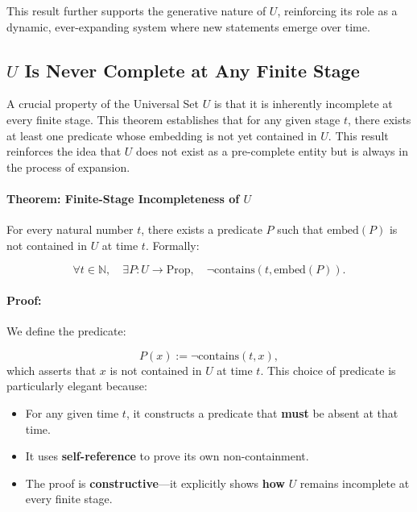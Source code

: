 \documentclass[12pt]{article}
\begin{document}
This result further supports the generative nature of \( U \), reinforcing its role as a dynamic, ever-expanding system where new statements emerge over time.


\subsection{\( U \) Is Never Complete at Any Finite Stage}

A crucial property of the Universal Set \( U \) is that it is inherently incomplete at every finite stage. This theorem establishes that for any given stage \( t \), there exists at least one predicate whose embedding is not yet contained in \( U \). This result reinforces the idea that \( U \) does not exist as a pre-complete entity but is always in the process of expansion.

\paragraph{Theorem: Finite-Stage Incompleteness of \( U \)}
For every natural number \( t \), there exists a predicate \( P \) such that \( \text{embed}(P) \) is not contained in \( U \) at time \( t \). Formally:

\begin{equation}
    \forall t \in \mathbb{N}, \quad \exists P: U \to \text{Prop}, \quad \neg \text{contains}(t, \text{embed}(P)).
\end{equation}

\paragraph{Proof:}
We define the predicate:

\begin{equation}
    P(x) := \neg \text{contains}(t, x),
\end{equation}
which asserts that \( x \) is not contained in \( U \) at time \( t \). This choice of predicate is particularly elegant because:
\begin{itemize}
    \item For any given time \( t \), it constructs a predicate that \textbf{must} be absent at that time.
    \item It uses \textbf{self-reference} to prove its own non-containment.
    \item The proof is \textbf{constructive}—it explicitly shows \textbf{how} \( U \) remains incomplete at every finite stage.
\end{itemize}
\end{document}
